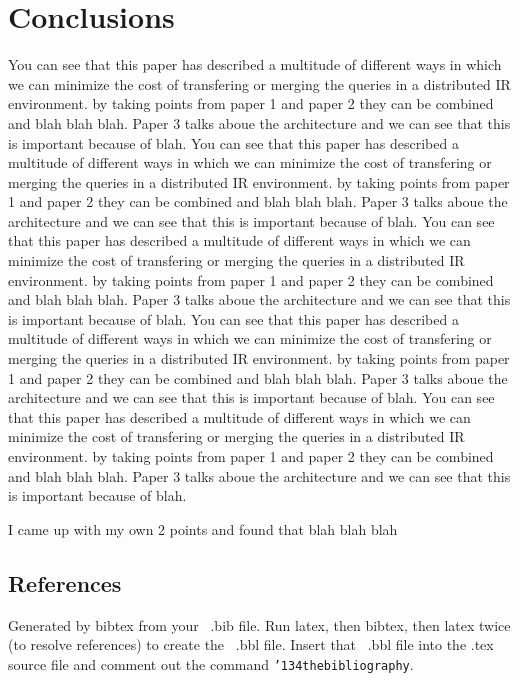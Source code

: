 \documentclass{acm_proc_article-sp}
\begin{document}
\section{Conclusions}
You can see that this paper has described a multitude of different ways in which we can minimize the cost of transfering or merging the queries in a distributed IR environment. by taking points from paper 1 and paper 2 they can be combined and blah blah blah. Paper 3 talks aboue the architecture and we can see that this is important because of blah.
You can see that this paper has described a multitude of different ways in which we can minimize the cost of transfering or merging the queries in a distributed IR environment. by taking points from paper 1 and paper 2 they can be combined and blah blah blah. Paper 3 talks aboue the architecture and we can see that this is important because of blah.
You can see that this paper has described a multitude of different ways in which we can minimize the cost of transfering or merging the queries in a distributed IR environment. by taking points from paper 1 and paper 2 they can be combined and blah blah blah. Paper 3 talks aboue the architecture and we can see that this is important because of blah.
You can see that this paper has described a multitude of different ways in which we can minimize the cost of transfering or merging the queries in a distributed IR environment. by taking points from paper 1 and paper 2 they can be combined and blah blah blah. Paper 3 talks aboue the architecture and we can see that this is important because of blah.
You can see that this paper has described a multitude of different ways in which we can minimize the cost of transfering or merging the queries in a distributed IR environment. by taking points from paper 1 and paper 2 they can be combined and blah blah blah. Paper 3 talks aboue the architecture and we can see that this is important because of blah.

I came up with my own 2 points and found that blah blah blah


 

\subsection{References}
Generated by bibtex from your ~.bib file.  Run latex,
then bibtex, then latex twice (to resolve references)
to create the ~.bbl file.  Insert that ~.bbl file into
the .tex source file and comment out
the command \texttt{{\char'134}thebibliography}.
\balancecolumns
\end{document}

